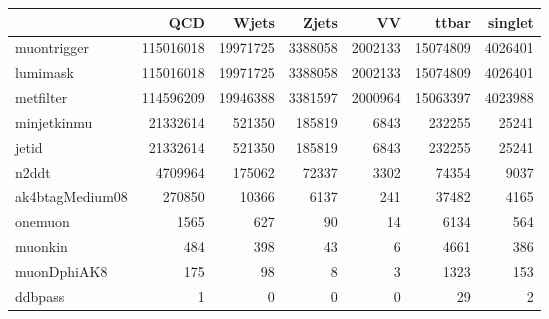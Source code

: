 \begin{tabular}{lrrrrrr}
\toprule
 & QCD & Wjets & Zjets & VV & ttbar & singlet \\
\midrule
muontrigger & 115016018 & 19971725 & 3388058 & 2002133 & 15074809 & 4026401 \\
lumimask & 115016018 & 19971725 & 3388058 & 2002133 & 15074809 & 4026401 \\
metfilter & 114596209 & 19946388 & 3381597 & 2000964 & 15063397 & 4023988 \\
minjetkinmu & 21332614 & 521350 & 185819 & 6843 & 232255 & 25241 \\
jetid & 21332614 & 521350 & 185819 & 6843 & 232255 & 25241 \\
n2ddt & 4709964 & 175062 & 72337 & 3302 & 74354 & 9037 \\
ak4btagMedium08 & 270850 & 10366 & 6137 & 241 & 37482 & 4165 \\
onemuon & 1565 & 627 & 90 & 14 & 6134 & 564 \\
muonkin & 484 & 398 & 43 & 6 & 4661 & 386 \\
muonDphiAK8 & 175 & 98 & 8 & 3 & 1323 & 153 \\
ddbpass & 1 & 0 & 0 & 0 & 29 & 2 \\
\bottomrule
\end{tabular}
